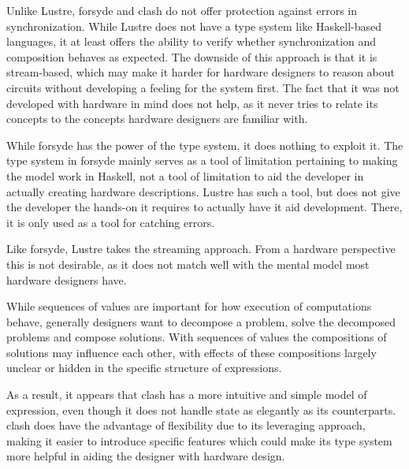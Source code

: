 Unlike Lustre, \gls{forsyde} and \gls{clash} do not offer protection against errors in synchronization. 
While Lustre does not have a type system like Haskell-based languages, it at least offers the ability to verify whether synchronization and composition behaves as expected.
The downside of this approach is that it is stream-based, which may make it harder for hardware designers to reason about circuits without developing a feeling for the system first.
The fact that it was not developed with hardware in mind does not help, as it never tries to relate its concepts to the concepts hardware designers are familiar with.

While \gls{forsyde} has the power of the type system, it does nothing to exploit it. 
The type system in \gls{forsyde} mainly serves as a tool of limitation pertaining to making the model work in Haskell, not a tool of limitation to aid the developer in actually creating hardware descriptions.
Lustre has such a tool, but does not give the developer the hands-on it requires to actually have it aid development. There, it is only used as a tool for catching errors.

Like \gls{forsyde}, Lustre takes the streaming approach. 
From a hardware perspective this is not desirable, as it does not match well with the mental model most hardware designers have.

While sequences of values are important for how execution of computations behave, generally designers want to decompose a problem, solve the decomposed problems and compose solutions.
With sequences of values the compositions of solutions may influence each other, with effects of these compositions largely unclear or hidden in the specific structure of expressions.

As a result, it appears that \gls{clash} has a more intuitive and simple model of expression, even though it does not handle state as elegantly as its counterparts.
\gls{clash} does have the advantage of flexibility due to its leveraging approach, making it easier to introduce specific features which could make its type system more helpful in aiding the designer with hardware design.
